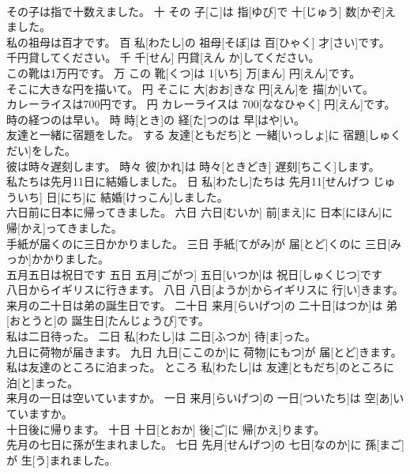 \documentclass[8pt]{extreport}
\begin{document}
\begin{CJK}{UTF8}{min}
\\	その子は指で十数えました。	十	その 子[こ]は 指[ゆび]で 十[じゅう] 数[かぞ]えました。	
\\	私の祖母は百才です。	百	私[わたし]の 祖母[そぼ]は 百[ひゃく] 才[さい]です。	
\\	千円貸してください。	千	千[せん] 円貸[えん か]してください。	
\\	この靴は1万円です。	万	この 靴[くつ]は 1[いち] 万[まん] 円[えん]です。	
\\	そこに大きな円を描いて。	円	そこに 大[おお]きな 円[えん]を 描[か]いて。	
\\	カレーライスは700円です。	円	カレーライスは 700[ななひゃく] 円[えん]です。	
\\	時の経つのは早い。	時	時[とき]の 経[た]つのは 早[はや]い。	
\\	友達と一緒に宿題をした。	する	友達[ともだち]と 一緒[いっしょ]に 宿題[しゅくだい]をした。	
\\	彼は時々遅刻します。	時々	彼[かれ]は 時々[ときどき] 遅刻[ちこく]します。	
\\	私たちは先月11日に結婚しました。	日	私[わたし]たちは 先月11[せんげつ じゅういち] 日[にち]に 結婚[けっこん]しました。	
\\	六日前に日本に帰ってきました。	六日	六日[むいか] 前[まえ]に 日本[にほん]に 帰[かえ]ってきました。	
\\	手紙が届くのに三日かかりました。	三日	手紙[てがみ]が 届[とど]くのに 三日[みっか]かかりました。	
\\	五月五日は祝日です	五日	五月[ごがつ] 五日[いつか]は 祝日[しゅくじつ]です	
\\	八日からイギリスに行きます。	八日	八日[ようか]からイギリスに 行[い]きます。	
\\	来月の二十日は弟の誕生日です。	二十日	来月[らいげつ]の 二十日[はつか]は 弟[おとうと]の 誕生日[たんじょうび]です。	
\\	私は二日待った。	二日	私[わたし]は 二日[ふつか] 待[ま]った。	
\\	九日に荷物が届きます。	九日	九日[ここのか]に 荷物[にもつ]が 届[とど]きます。	
\\	私は友達のところに泊まった。	ところ	私[わたし]は 友達[ともだち]のところに 泊[と]まった。	
\\	来月の一日は空いていますか。	一日	来月[らいげつ]の 一日[ついたち]は 空[あ]いていますか。	
\\	十日後に帰ります。	十日	十日[とおか] 後[ご]に 帰[かえ]ります。	
\\	先月の七日に孫が生まれました。	七日	先月[せんげつ]の 七日[なのか]に 孫[まご]が 生[う]まれました。	

\end{CJK}
\end{document}
